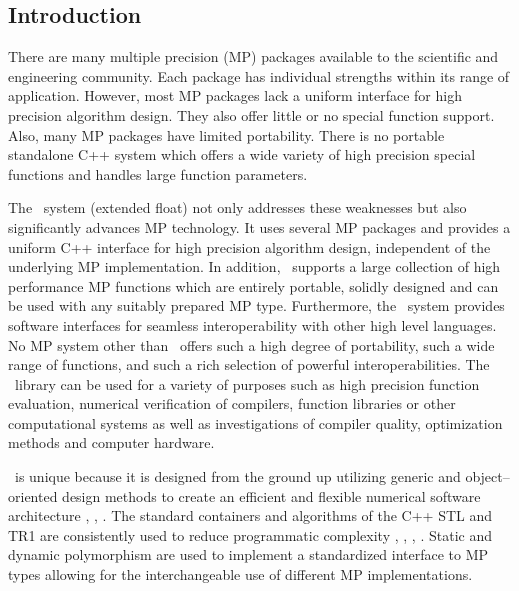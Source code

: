 \subsection{Introduction}

There are many multiple precision (MP) packages available to
the scientific and engineering community.
Each package has individual strengths within its range
of application. However, most MP packages lack a uniform interface
for high precision algorithm design. They also offer little or
no special function support. Also, many MP packages have
limited portability. There is no portable standalone C++ system
which offers a wide variety of high precision special functions
and handles large function parameters.

The \efloat\ system (extended float) not only addresses these weaknesses
but also significantly advances MP technology. It uses several 
MP packages and provides a uniform C++ interface for high precision
algorithm design, independent of the underlying MP implementation.
In addition, \efloat\ supports a large collection
of high performance MP functions which are
entirely portable, solidly designed and can be used with any
suitably prepared MP type. Furthermore, the \efloat\ system
provides software interfaces for seamless interoperability
with other high level languages.
No MP system other than \efloat\ offers such a high degree
of portability, such a wide range of functions, and such
a rich selection of powerful interoperabilities.
The \efloat\ library can be used for a variety of
purposes such as high precision function evaluation,
numerical verification of compilers, function libraries or
other computational systems as well as investigations of
compiler quality, optimization methods and computer hardware.

\efloat\ is unique because it is designed from the ground up utilizing
generic and object--oriented design methods to create an efficient and
flexible numerical software architecture
\cite{coplien:textbook}, \cite{vandevoorde:textbook}, \cite{yang:textbook}.
The standard containers and algorithms of the C++ STL and TR1 are
consistently used to reduce programmatic complexity \cite{becker:textbook},
\cite{isoiec14882:textbook}, \cite{isoiec19768:textbook}, \cite{josuttis:textbook}.
Static and dynamic polymorphism are used to implement a standardized
interface to MP types allowing for the interchangeable use of different
MP implementations.

